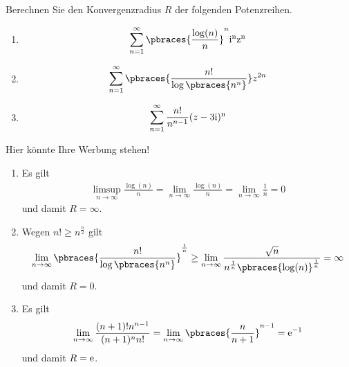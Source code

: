 \begin{exercise}
    Berechnen Sie den Konvergenzradius $R$ der folgenden Potenzreihen. 
    \begin{enumerate}[label = \alph*)]
        \item 
        \begin{align*}
            \sum_{n = 1}^\infty \pbraces{\frac{\log(n)}{n}}^n \rm{i}^n z^n
        \end{align*}
        \item 
        \begin{align*}
            \sum_{n = 1}^\infty \pbraces{\frac{n!}{\log\pbraces{n^n}}} z^{2n}    
        \end{align*}
        \item 
        \begin{align*}
            \sum_{n = 1}^\infty \frac{n!}{n^{n-1}}(z - 3\rm{i})^n
        \end{align*}
    \end{enumerate}
\end{exercise}

\begin{solution}
    Hier könnte Ihre Werbung stehen!
    \begin{enumerate}[label = \alph*)]
        \item Es gilt 
            \begin{align*}
                \limsup_{n \to \infty} \frac{\log(n)}{n} = \lim_{n \to \infty} \frac{\log(n)}{n} = \lim_{n \to \infty} \frac{1}{n} = 0
            \end{align*}
            und damit $R = \infty$.
        \item Wegen $n! \geq n^{\frac{n}{2}}$ gilt
        \begin{align*}
            \lim_{n \to \infty} \pbraces{\frac{n!}{\log\pbraces{n^n}}}^{\frac{1}{n}} \geq \lim_{n \to \infty} \frac{\sqrt{n}}{n^{\frac{1}{n}} \pbraces{\log(n)}^{\frac{1}{n}}} = \infty
        \end{align*}
        und damit $R = 0$.
        \item Es gilt
            \begin{align*}
                \lim_{n \to \infty} \frac{(n + 1)! n^{n - 1}}{(n + 1)^n n!} = \lim_{n \to \infty} \pbraces{\frac{n}{n + 1}}^{n - 1} = \rm{e}^{-1}
            \end{align*}
            und damit $R = \rm{e}$.
    \end{enumerate}
\end{solution}